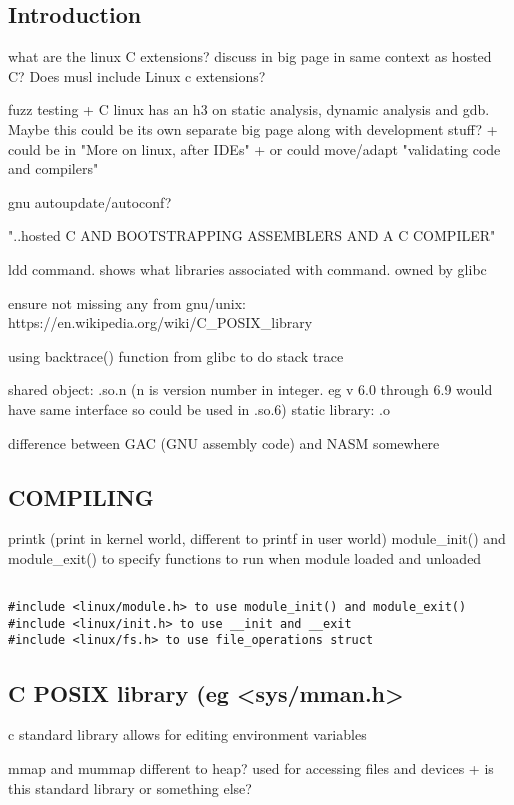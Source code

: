 
\subsection{Introduction}

what are the linux C extensions? discuss in big page in same context as hosted C? Does musl include Linux c extensions?

fuzz testing
+ C linux has an h3 on static analysis, dynamic analysis and gdb. Maybe this could be its own separate big page along with development stuff?
+ could be in "More on linux, after IDEs"
+ or could move/adapt "validating code and compilers"


gnu autoupdate/autoconf?

"..hosted C AND BOOTSTRAPPING ASSEMBLERS AND A C COMPILER"

ldd command. shows what libraries associated with command. owned by glibc


ensure not missing any from gnu/unix:
https://en.wikipedia.org/wiki/C\_POSIX\_library

using backtrace() function from glibc to do stack trace

shared object: .so.n (n is version number in integer. eg v 6.0 through 6.9 would have same interface so could be used in .so.6)
static library: .o


difference between GAC (GNU assembly code) and NASM somewhere

\subsection{COMPILING}
printk (print in kernel world, different to printf in user world)
module\_init() and module\_exit() to specify functions to run when module loaded and unloaded
\begin{verbatim}

#include <linux/module.h> to use module_init() and module_exit()
#include <linux/init.h> to use __init and __exit
#include <linux/fs.h> to use file_operations struct
\end{verbatim}

\subsection{C POSIX library (eg <sys/mman.h>}
c standard library allows for editing environment variables

mmap and mummap different to heap? used for accessing files and devices
+ is this standard library or something else?

